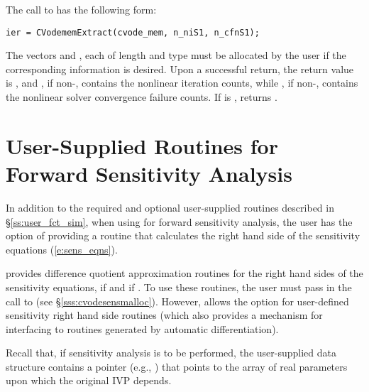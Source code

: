 The call to  has the following form:
\begin{verbatim}
ier = CVodememExtract(cvode_mem, n_niS1, n_cfnS1);
\end{verbatim}
The vectors  and , each of length  and type
 must be allocated by the user if the corresponding information
is desired. Upon a successful return, the return value is , and
, if non-, contains the nonlinear iteration counts,
while , if non-, contains the nonlinear solver convergence failure counts.
If  is ,  returns .

\section{User-Supplied Routines for Forward Sensitivity Analysis}\label{ss:user_fct_fwd}

In addition to the required and optional user-supplied routines described
in \S\ref{ss:user_fct_sim}, when using {\cvodes} for forward sensitivity analysis,
the user has the option of providing a routine that calculates the right hand side 
of the sensitivity equations (\ref{e:sens_eqns}).

{\cvodes} provides difference quotient approximation routines for the right
hand sides of the sensitivity equations,  if 
and  if . 
To use these routines, the user must pass  in the call to
 (see \S\ref{sss:cvodesensmalloc}). However, {\cvodes}
allows the option for user-defined sensitivity right hand side routines
(which also provides a mechanism for interfacing {\cvodes} to routines
generated by automatic differentiation).

Recall that, if sensitivity analysis is to be performed, the user-supplied 
data structure  contains a pointer (e.g., ) that points 
to the array of real parameters upon which the original IVP depends.

